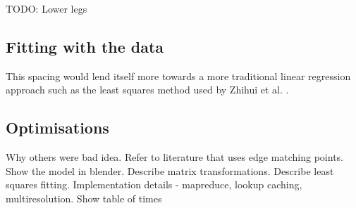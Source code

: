 TODO: Lower legs


\subsection{Fitting with the data}

This spacing would lend itself more towards a more traditional linear regression approach such as the least squares method used by Zhihui et al. \cite{LinearModelFitting}.

\subsection{Optimisations}

Why others were bad idea.
Refer to literature that uses edge matching points.
Show the model in blender.
Describe matrix transformations.
Describe least squares fitting.
Implementation details - mapreduce, lookup caching, multiresolution.  Show table of times